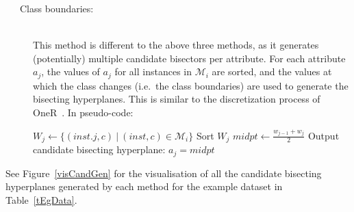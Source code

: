 \documentclass[a4paper,12pt]{article} %
\newcommand{\mcl}[1]{\mathcal{#1}}
\begin{document}
\begin{description}
\item[~~~Class boundaries:]  \ \\
    This method is different to the above three methods,
        as it generates (potentially) multiple candidate bisectors 
        per attribute.
    For each attribute $a_j$, 
        the values of $a_j$ for all instances in $\mcl{M}_i$ are sorted,
        and the values at which the class changes (i.e.\ the class boundaries)
        are used to generate the bisecting hyperplanes.
    This is similar to the discretization process of OneR~\cite{holte}.
    In pseudo-code:
    \begin{algorithmic}
        \State $W_j \gets \{ (inst.j,c) ~|~ (inst,c) \in \mcl{M}_i \}$
        \State Sort $W_j$
            \State $midpt \gets \frac{w_{j-1}+w_j}{2}$
            \State Output candidate bisecting hyperplane: $a_j = midpt$
        \EndFor
    \EndFor
    \end{algorithmic}
\end{description}

See Figure~\ref{visCandGen} for the visualisation of all the 
    candidate bisecting hyperplanes generated by each method
    for the example dataset in Table~\ref{tEgData}.

\FloatBarrier
\end{document}
